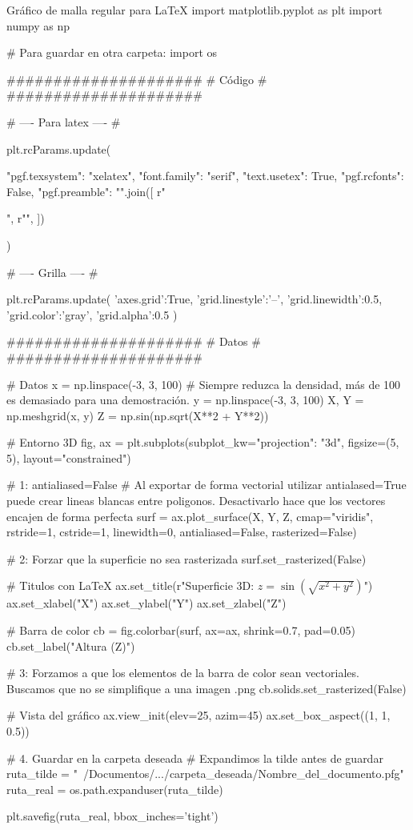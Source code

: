 \begin{pycode}{Gráfico de malla regular para LaTeX}
import matplotlib.pyplot as plt
import numpy as np

# Para guardar en otra carpeta:
import os

#####################
#       Código      #
#####################

# ---- Para latex ---- #

plt.rcParams.update({
    "pgf.texsystem": "xelatex",    
    "font.family": "serif",
    "text.usetex": True,       
    "pgf.rcfonts": False,          
    "pgf.preamble": "\n".join([    
         r"\usepackage{fontspec}",
         r"\setmainfont{CMU Serif}",
    ])
})

# ---- Grilla ---- #

plt.rcParams.update({
    'axes.grid':True,
    'grid.linestyle':'--',
    'grid.linewidth':0.5,
    'grid.color':'gray',
    'grid.alpha':0.5
})
    
#####################
#       Datos       #
#####################

# Datos
x = np.linspace(-3, 3, 100) # Siempre reduzca la densidad, más de 100 es demasiado para una demostración.
y = np.linspace(-3, 3, 100)
X, Y = np.meshgrid(x, y)
Z = np.sin(np.sqrt(X**2 + Y**2))

# Entorno 3D
fig, ax = plt.subplots(subplot_kw={"projection": "3d"}, figsize=(5, 5), layout="constrained")

# 1: antialiased=False
# Al exportar de forma vectorial utilizar antialased=True puede crear lineas blancas entre poligonos. Desactivarlo hace que los vectores encajen de forma perfecta
surf = ax.plot_surface(X, Y, Z, cmap="viridis", rstride=1, cstride=1, 
                       linewidth=0, antialiased=False, rasterized=False)

# 2: Forzar que la superficie no sea rasterizada
surf.set_rasterized(False)

# Titulos con LaTeX
ax.set_title(r"Superficie 3D: $z = \sin(\sqrt{x^2 + y^2})$") 
ax.set_xlabel("X")
ax.set_ylabel("Y")
ax.set_zlabel("Z")

# Barra de color
cb = fig.colorbar(surf, ax=ax, shrink=0.7, pad=0.05)
cb.set_label("Altura (Z)")

# 3: Forzamos a que los elementos de la barra de color sean vectoriales. Buscamos que no se simplifique a una imagen .png
cb.solids.set_rasterized(False)

# Vista del gráfico
ax.view_init(elev=25, azim=45)
ax.set_box_aspect((1, 1, 0.5))

# 4. Guardar en la carpeta deseada
# Expandimos la tilde antes de guardar
ruta_tilde = "~/Documentos/.../carpeta_deseada/Nombre_del_documento.pfg"
ruta_real = os.path.expanduser(ruta_tilde)

plt.savefig(ruta_real, bbox_inches='tight')
\end{pycode}